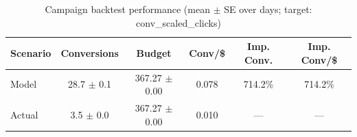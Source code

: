 \begin{table}[htbp]
\centering
\caption{Campaign backtest performance (mean $\pm$ SE over days; target: conv_scaled_clicks)}
\begin{tabular}{lccccc}
\toprule
Scenario & Conversions & Budget & Conv/\$ & Imp. Conv. & Imp. Conv/\$ \\
\midrule
Model & 28.7 $\pm$ 0.1 & 367.27 $\pm$ 0.00 & 0.078 & 714.2\% & 714.2\% \\
Actual & 3.5 $\pm$ 0.0 & 367.27 $\pm$ 0.00 & 0.010 & --- & --- \\
\bottomrule
\end{tabular}

\end{table}
